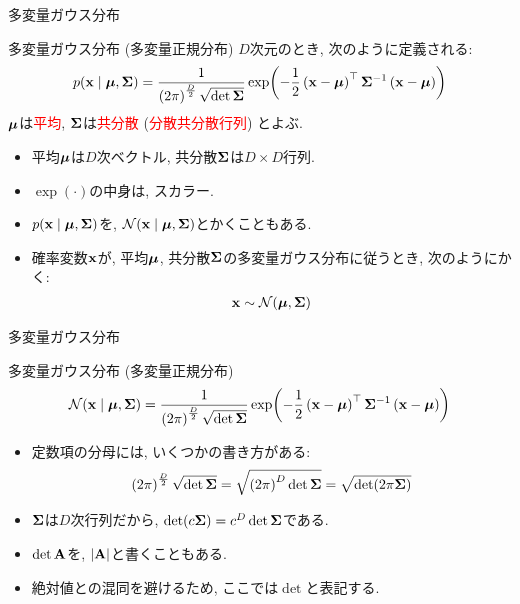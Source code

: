 \documentclass[dvipdfmx,notheorems,t]{beamer}
\begin{document}
\begin{frame}{多変量ガウス分布}
\begin{block}{多変量ガウス分布 (多変量正規分布)}
  $D$次元のとき, 次のように定義される:
  \begin{align*}
    p(\vb{x} \mid \vb*{\mu}, \vb{\Sigma})
      = \frac{1}{\left( 2\pi \right)^\frac{D}{2} \sqrt{\det \vb{\Sigma}}}
        \exp(-\frac{1}{2} \left( \vb{x} - \vb*{\mu} \right)^\top \vb{\Sigma}^{-1}
        \left( \vb{x} - \vb*{\mu} \right))
  \end{align*}
  $\vb*{\mu}$は\textcolor{red}{平均}, $\vb{\Sigma}$は\textcolor{red}{共分散} (\textcolor{red}{分散共分散行列}) とよぶ.
\end{block}

\begin{itemize}
  \item 平均$\vb*{\mu}$は$D$次ベクトル, 共分散$\vb{\Sigma}$は$D \times D$行列.
  \item $\exp(\cdot)$の中身は, スカラー.
  \item $p(\vb{x} \mid \vb*{\mu}, \vb{\Sigma})$を, $\mathcal{N}(\vb{x} \mid \vb*{\mu}, \vb{\Sigma})$とかくこともある.
  \item 確率変数$\vb{x}$が, 平均$\vb*{\mu}$, 共分散$\vb{\Sigma}$の多変量ガウス分布に従うとき, 次のようにかく:
  \begin{align*}
    \vb{x} \sim \mathcal{N}(\vb*{\mu}, \vb{\Sigma})
  \end{align*}
\end{itemize}
\end{frame}

\begin{frame}{多変量ガウス分布}
\begin{block}{多変量ガウス分布 (多変量正規分布)}
  \begin{align*}
    \mathcal{N}(\vb{x} \mid \vb*{\mu}, \vb{\Sigma})
      = \frac{1}{\left( 2\pi \right)^\frac{D}{2} \sqrt{\det \vb{\Sigma}}}
        \exp(-\frac{1}{2} \left( \vb{x} - \vb*{\mu} \right)^\top \vb{\Sigma}^{-1}
        \left( \vb{x} - \vb*{\mu} \right))
  \end{align*}
\end{block}

\begin{itemize}
  \item 定数項の分母には, いくつかの書き方がある:
  \begin{align*}
    \left( 2\pi \right)^\frac{D}{2} \sqrt{\det \vb{\Sigma}}
    = \sqrt{\left( 2\pi \right)^D \det \vb{\Sigma}}
    = \sqrt{\det(2\pi \vb{\Sigma})}
  \end{align*}
  \item $\vb{\Sigma}$は$D$次行列だから, $\det(c \vb{\Sigma}) = c^D \det \vb{\Sigma}$である.
  \item $\det \vb{A}$を, $\left| \vb{A} \right|$と書くこともある.
  \item 絶対値との混同を避けるため, ここでは$\det$と表記する.
\end{itemize}
\end{frame}
\end{document}
